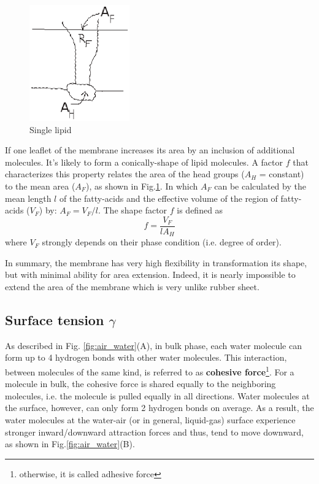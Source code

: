 \begin{figure}[htb]
  \centerline{\includegraphics[height=5cm]{./images/single-lipid.eps}}
  \caption{Single lipid}\label{fig:single-lipid}
\end{figure}

If one leaflet of the membrane increases its area by an inclusion of
additional molecules. It's likely to form a conically-shape of lipid
molecules. A factor $f$ that characterizes this property relates the
area of the head groups ($A_H$ = constant) to the mean area ($A_F$),
as shown in Fig.\ref{fig:single-lipid}. In which $A_F$ can be
calculated by the mean length $l$ of the fatty-acids and the effective
volume of the region of fatty-acids ($V_F$) by: $A_F = V_F/l$. The
shape factor $f$ is defined as
\begin{equation}
  f = \frac{V_F}{lA_H}
\end{equation}
where $V_F$ strongly depends on their phase condition (i.e. degree of
order).

In summary, the membrane has very high flexibility in transformation
its shape, but with minimal ability for area extension. Indeed, it is
nearly impossible to extend the area of the membrane which is very
unlike rubber sheet.


\subsection{Surface tension $\gamma$}

As described in Fig. \ref{fig:air_water}(A), in bulk phase, each water
molecule can form up to 4 hydrogen bonds with other water
molecules. This interaction, between molecules of the same kind, is
referred to as {\bf cohesive
  force}\footnote{otherwise,
  it is called adhesive force}.
For a molecule in bulk, the cohesive force is shared equally to the
neighboring molecules, i.e. the molecule is pulled equally in all
directions.  Water molecules at the surface, however, can only form 2
hydrogen bonds on average. As a
result, %
the water molecules at the water-air (or in
general, liquid-gas) surface experience stronger inward/downward
attraction forces and thus, tend to move downward, as shown in
Fig.\ref{fig:air_water}(B).

